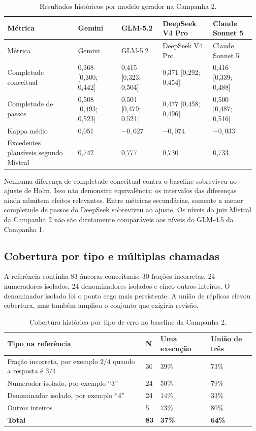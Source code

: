 \documentclass[11pt,a4paper]{article}
\begin{document}
\begingroup
\footnotesize
\setlength{\tabcolsep}{3pt}
\begin{longtable}{@{}P{3.4cm}C{2.35cm}C{2.35cm}C{2.35cm}C{2.35cm}@{}}
\caption{Resultados históricos por modelo gerador na Campanha 2.}\label{tab:s-c2-models}\\
\toprule
Métrica & Gemini & GLM-5.2 & DeepSeek V4 Pro & Claude Sonnet 5 \\
\midrule
\endfirsthead
\toprule
Métrica & Gemini & GLM-5.2 & DeepSeek V4 Pro & Claude Sonnet 5 \\
\midrule
\endhead
Completude conceitual & 0,368 [0,300; 0,442] & 0,415 [0,323; 0,504] & 0,371 [0,292; 0,454] & 0,416 [0,339; 0,488] \\
Completude de passos & 0,508 [0,493; 0,523] & 0,501 [0,479; 0,521] & 0,477 [0,458; 0,496] & 0,500 [0,487; 0,516] \\
Kappa médio & 0,051 & $-0,027$ & $-0,074$ & $-0,033$ \\
Excedentes plausíveis segundo Mistral & 0,742 & 0,777 & 0,730 & 0,733 \\
\bottomrule
\end{longtable}
\endgroup

Nenhuma diferença de completude conceitual contra o baseline sobreviveu ao ajuste de Holm. Isso não demonstra equivalência: os intervalos das diferenças ainda admitem efeitos relevantes. Entre métricas secundárias, somente a menor completude de passos do DeepSeek sobreviveu ao ajuste. Os níveis do juiz Mistral da Campanha 2 não são diretamente comparáveis aos níveis do GLM-4.5 da Campanha 1.

\subsection{Cobertura por tipo e múltiplas chamadas}

A referência continha 83 âncoras conceituais: 30 frações incorretas, 24 numeradores isolados, 24 denominadores isolados e cinco outros inteiros. O denominador isolado foi o ponto cego mais persistente. A união de réplicas elevou cobertura, mas também ampliou o conjunto que exigiria revisão.

\begin{table}[H]
\centering
\caption{Cobertura histórica por tipo de erro no baseline da Campanha 2.}
\label{tab:s-c2-error-types}
\small
\begin{tabularx}{\textwidth}{@{}Y R{1.4cm}R{2.3cm}R{2.3cm}@{}}
\toprule
Tipo na referência & N & Uma execução & União de três \\
\midrule
Fração incorreta, por exemplo $2/4$ quando a resposta é $3/4$ & 30 & 39\% & 73\% \\
Numerador isolado, por exemplo ``3'' & 24 & 50\% & 79\% \\
Denominador isolado, por exemplo ``4'' & 24 & 14\% & 33\% \\
Outros inteiros & 5 & 73\% & 80\% \\
\midrule
\textbf{Total} & \textbf{83} & \textbf{37\%} & \textbf{64\%} \\
\bottomrule
\end{tabularx}
\end{table}
\end{document}
